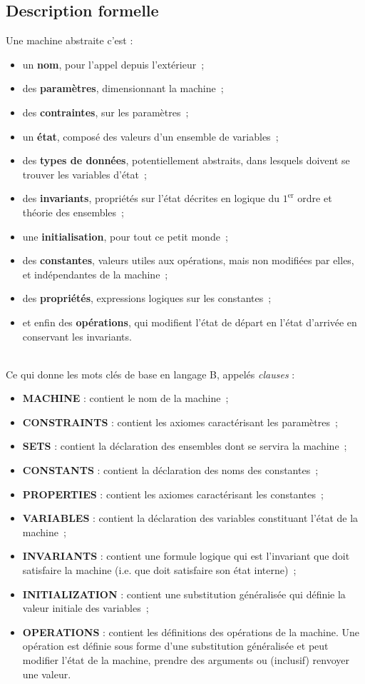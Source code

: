 \documentclass[10pt,a4paper]{article}
\begin{document}
\subsection{Description formelle}

Une machine abstraite c'est :
\begin{itemize}
\item un \textbf{nom}, pour l'appel depuis l'extérieur~;
\item des \textbf{paramètres}, dimensionnant la machine~;
\item des \textbf{contraintes}, sur les paramètres~;
\item un \textbf{état}, composé des valeurs d'un ensemble de variables~;
\item des \textbf{types de données}, potentiellement abstraits, dans lesquels doivent se trouver les variables d'état~;
\item des \textbf{invariants}, propriétés sur l'état décrites en logique du $1^{\text{er}}$ ordre et théorie des ensembles~;
\item une \textbf{initialisation}, pour tout ce petit monde~;
\item des \textbf{constantes}, valeurs utiles aux opérations, mais non modifiées par elles, et indépendantes de la machine~;
\item des \textbf{propriétés}, expressions logiques sur les constantes~;
\item et enfin des \textbf{opérations}, qui modifient l'état de départ en l'état d'arrivée en conservant les invariants.
\end{itemize}
\ \\
Ce qui donne les mots clés de base en langage B, appelés \emph{clauses} :
\begin{itemize}
\item \textbf{MACHINE} : contient le nom de la machine~;
\item \textbf{CONSTRAINTS} : contient les axiomes caractérisant les paramètres~;
\item \textbf{SETS} : contient la déclaration des ensembles dont se servira la machine~;
\item \textbf{CONSTANTS} : contient la déclaration des noms des constantes~;
\item \textbf{PROPERTIES} : contient les axiomes caractérisant les constantes~;
\item \textbf{VARIABLES} : contient la déclaration des variables constituant l'état de la machine~;
\item \textbf{INVARIANTS} : contient une formule logique qui est l'invariant que doit satisfaire la machine (i.e. que doit satisfaire son état interne)~;
\item \textbf{INITIALIZATION} : contient une substitution généralisée qui définie la valeur initiale des variables~;
\item \textbf{OPERATIONS} : contient les définitions des opérations de la machine. Une opération est définie sous forme d'une substitution généralisée et peut modifier l'état de la machine, prendre des arguments ou (inclusif) renvoyer une valeur.
\end{itemize}
\end{document}
